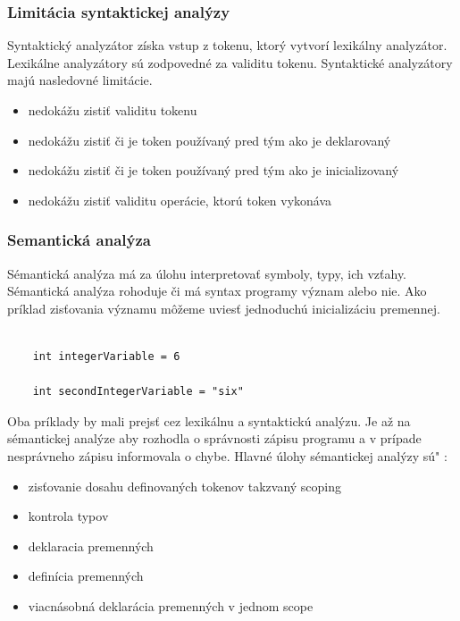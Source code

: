 \subsubsection{Limitácia syntaktickej analýzy}
\indent Syntaktický analyzátor získa vstup z tokenu, ktorý vytvorí lexikálny analyzátor. Lexikálne analyzátory sú zodpovedné za validitu tokenu. Syntaktické analyzátory majú nasledovné limitácie.

\begin{itemize}
	\item nedokážu zistiť validitu tokenu
	\item nedokážu zistiť či je token používaný pred tým ako je deklarovaný
	\item nedokážu zistiť či je token používaný pred tým ako je inicializovaný
	\item nedokážu zistiť validitu operácie, ktorú token vykonáva
\end{itemize}



\subsubsection{Semantická  analýza}
\indent Sémantická analýza má za úlohu interpretovať symboly, typy, ich vzťahy. Sémantická analýza rohoduje či má syntax programy význam alebo nie.
Ako príklad zisťovania významu môžeme uviesť jednoduchú inicializáciu premennej.\cite{gram}

\begin{lstlisting}

	int integerVariable = 6

	int secondIntegerVariable = "six"
\end{lstlisting}

Oba príklady by mali prejsť cez lexikálnu a syntaktickú analýzu. Je až na sémantickej analýze aby rozhodla o správnosti zápisu programu a v prípade nesprávneho zápisu informovala o chybe.  Hlavné úlohy sémantickej analýzy sú" :

\begin{itemize}
	\item zisťovanie dosahu definovaných tokenov takzvaný scoping
	\item kontrola typov
	\item deklaracia premenných
	\item definícia premenných
	\item viacnásobná deklarácia premenných v jednom scope
\end{itemize}

